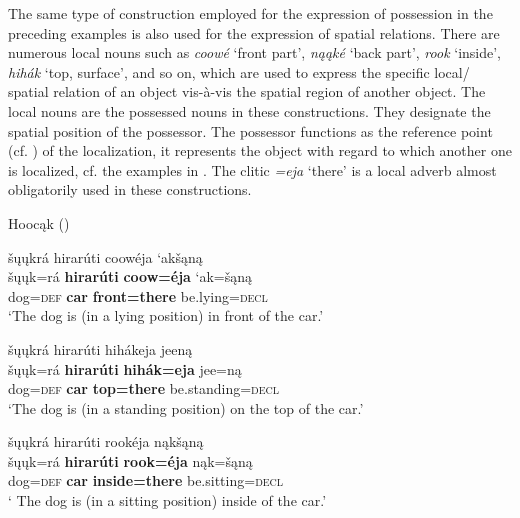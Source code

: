 \documentclass[output=paper]{LSP/langsci}
\begin{document}
The same type of construction employed for the expression of possession in the preceding examples is also used for the expression of spatial relations. There are numerous local nouns such as \textit{coow\'e}  `front part', \textit{n\k{a}\k{a}k\'e} `back part', \textit{rook} `inside', \textit{hihák} `top, surface', and so on, which are used to express the specific local/ spatial relation of an object vis-à-vis the spatial region of another object. The local nouns are the possessed nouns in these constructions. They designate the spatial position of the possessor. The possessor functions as the reference point (cf. \citealt{Langacker1993}) of the localization, it represents the object with regard to which another one is localized, cf. the examples in . The clitic \textit{=eja} `there' is a local adverb almost obligatorily used in these constructions. 
 
\ea Hooc\k{a}k (\citealt[14]{Helmbrecht2003}) \label{dogposition}

\ea 
\glll \v{s}\k{u}\k{u}kr\'a hirar\'uti  coow\'eja `ak\v{s}\k{a}n\k{a}  \\
\v{s}\k{u}\k{u}k=r\'a \textbf{hirar\'uti}  \textbf{coow=\'eja} `ak=\v{s}\k{a}n\k{a} \\ 
dog=\textsc{def} \textbf{car} \textbf{front=there} be.lying=\textsc{decl} \\
\glt `The dog is (in a lying position) in front of the car.'

\ex 
\glll šųųkrá hirarúti hihákeja jeen\k{a}\\
\v{s}\k{u}\k{u}k=r\'a \textbf{hirar\'uti} \textbf{hih\'ak=eja} jee=n\k{a} \\
dog=\textsc{def}  \textbf{car} \textbf{top=there} be.standing=\textsc{decl} \\
\glt `The dog is (in a standing position) on the top of the car.'

\ex 
\glll šųųkrá hirarúti rookéja n\k{a}k\v{s}\k{a}n\k{a}\\
\v{s}\k{u}\k{u}k=r\'a   \textbf{hirar\'uti} \textbf{rook=\'eja} n\k{a}k=\v{s}\k{a}n\k{a} \\
dog=\textsc{def} \textbf{car} \textbf{inside=there} be.sitting=\textsc{decl} \\
\glt` The dog is (in a sitting position) inside of the car.'
\z
\z
\end{document}
